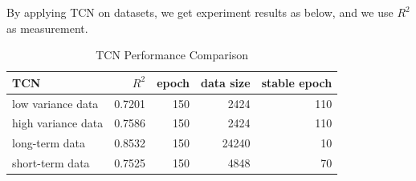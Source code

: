 By applying TCN on datasets, we get experiment results as below, and we use $R^2$ as measurement.
\begin{table}[H]
\centering
\caption{TCN Performance Comparison}
\begin{tabular}{l r r r r}
\toprule
\textbf{TCN} & \textbf{$R^2$} & \textbf{epoch} & \textbf{data size}& \textbf{stable epoch}\\
\midrule
low variance data & 0.7201& 150& 2424& 110\\
high variance data & 0.7586& 150& 2424& 110 \\
long-term data& 0.8532& 150& 24240& 10 \\
short-term data& 0.7525& 150& 4848& 70 \\
\bottomrule
\end{tabular}
\label{tab:TCN}
\end{table}

